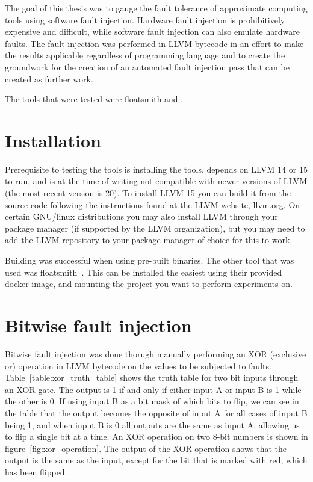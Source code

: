 
The goal of this thesis was to gauge the fault tolerance of approximate computing tools using software fault injection. Hardware fault injection is prohibitively expensive and difficult, while software fault injection can also emulate hardware faults. The fault injection was performed in LLVM bytecode in an effort to make the results applicable regardless of programming language and to create the groundwork for the creation of an automated fault injection pass that can be created as further work.

The tools that were tested were floatsmith and \taffo{}.

\section{Installation}
Prerequisite to testing the tools is installing the tools. \taffo{} depends on LLVM 14 or 15 to run, and is at the time of writing not compatible with newer versions of LLVM (the most recent version is 20). To install LLVM 15 you can build it from the source code following the instructions found at the LLVM website, \href{llvm.org}{llvm.org}. On certain GNU/linux distributions you may also install LLVM through your package manager (if supported by the LLVM organization), but you may need to add the LLVM repository  to your package manager of choice for this to work. 

Building \taffo{} was successful when using pre-built binaries. 
The other tool that was used was floatsmith~\citep{floatsmith_paper}. This can be installed the easiest using their provided docker image, and mounting the project you want to perform experiments on.

\section{Bitwise fault injection}\label{section:bitwise_fault_injection}
Bitwise fault injection was done thorugh manually performing an XOR (exclusive or) operation in LLVM bytecode on the values to be subjected to faults. Table~\ref{table:xor_truth_table} shows the truth table for two bit inputs through an XOR-gate. The output is 1 if and only if either input A or input B is 1 while the other is 0. If using input B as a bit mask of which bits to flip, we can see in the table that the output becomes the opposite of input A for all cases of input B being 1, and when input B is 0 all outputs are the same as input A, allowing us to flip a single bit at a time. An XOR operation on two 8-bit numbers is shown in figure~\ref{fig:xor_operation}. The output of the XOR operation shows that the output is the same as the input, except for the bit that is marked with red, which has been flipped.

